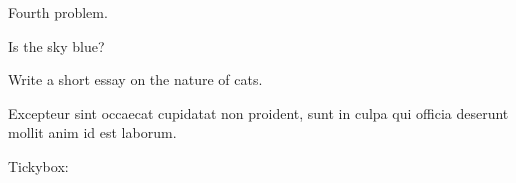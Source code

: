 \documentclass{nmd/exam}
\begin{document}
\begin{problems}
\begin{subproblems}
        
      \end{subproblems}


    \item Fourth problem.
      \begin{subproblems}
      \item Is the sky blue?  \quad \truefalse

      \item Write a short essay on the nature of cats.

        \vfill

      \item Excepteur sint occaecat cupidatat non proident, sunt in
        culpa qui officia deserunt mollit anim id est laborum.

        \vspace{4cm}

        \hfill Tickybox: \quad \checkbox
      \end{subproblems}
    \end{problems}
\end{document}
